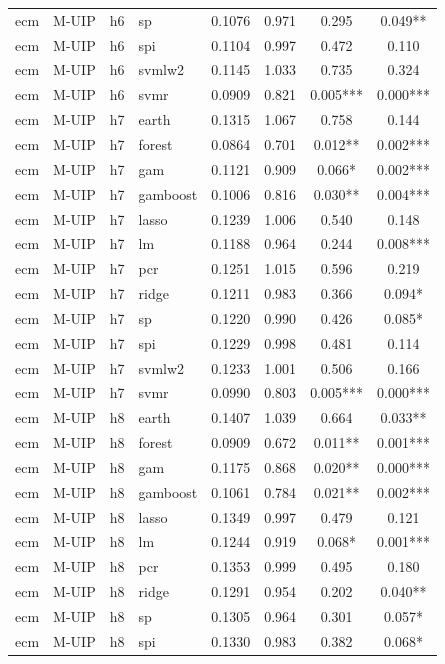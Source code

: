 \begin{ThreePartTable}
\begin{longtable}[t]{llclcccc}
ecm & M-UIP & h6 & sp & 0.1076 & 0.971 & 0.295 & 0.049**\\
ecm & M-UIP & h6 & spi & 0.1104 & 0.997 & 0.472 & 0.110\\
ecm & M-UIP & h6 & svmlw2 & 0.1145 & 1.033 & 0.735 & 0.324\\
ecm & M-UIP & h6 & svmr & 0.0909 & 0.821 & 0.005*** & 0.000***\\
\addlinespace
ecm & M-UIP & h7 & earth & 0.1315 & 1.067 & 0.758 & 0.144\\
ecm & M-UIP & h7 & forest & 0.0864 & 0.701 & 0.012** & 0.002***\\
ecm & M-UIP & h7 & gam & 0.1121 & 0.909 & 0.066* & 0.002***\\
ecm & M-UIP & h7 & gamboost & 0.1006 & 0.816 & 0.030** & 0.004***\\
ecm & M-UIP & h7 & lasso & 0.1239 & 1.006 & 0.540 & 0.148\\
ecm & M-UIP & h7 & lm & 0.1188 & 0.964 & 0.244 & 0.008***\\
ecm & M-UIP & h7 & pcr & 0.1251 & 1.015 & 0.596 & 0.219\\
ecm & M-UIP & h7 & ridge & 0.1211 & 0.983 & 0.366 & 0.094*\\
ecm & M-UIP & h7 & sp & 0.1220 & 0.990 & 0.426 & 0.085*\\
ecm & M-UIP & h7 & spi & 0.1229 & 0.998 & 0.481 & 0.114\\
ecm & M-UIP & h7 & svmlw2 & 0.1233 & 1.001 & 0.506 & 0.166\\
ecm & M-UIP & h7 & svmr & 0.0990 & 0.803 & 0.005*** & 0.000***\\
\addlinespace
ecm & M-UIP & h8 & earth & 0.1407 & 1.039 & 0.664 & 0.033**\\
ecm & M-UIP & h8 & forest & 0.0909 & 0.672 & 0.011** & 0.001***\\
ecm & M-UIP & h8 & gam & 0.1175 & 0.868 & 0.020** & 0.000***\\
ecm & M-UIP & h8 & gamboost & 0.1061 & 0.784 & 0.021** & 0.002***\\
ecm & M-UIP & h8 & lasso & 0.1349 & 0.997 & 0.479 & 0.121\\
ecm & M-UIP & h8 & lm & 0.1244 & 0.919 & 0.068* & 0.001***\\
ecm & M-UIP & h8 & pcr & 0.1353 & 0.999 & 0.495 & 0.180\\
ecm & M-UIP & h8 & ridge & 0.1291 & 0.954 & 0.202 & 0.040**\\
ecm & M-UIP & h8 & sp & 0.1305 & 0.964 & 0.301 & 0.057*\\
ecm & M-UIP & h8 & spi & 0.1330 & 0.983 & 0.382 & 0.068*\\

\end{longtable}
\end{ThreePartTable}
